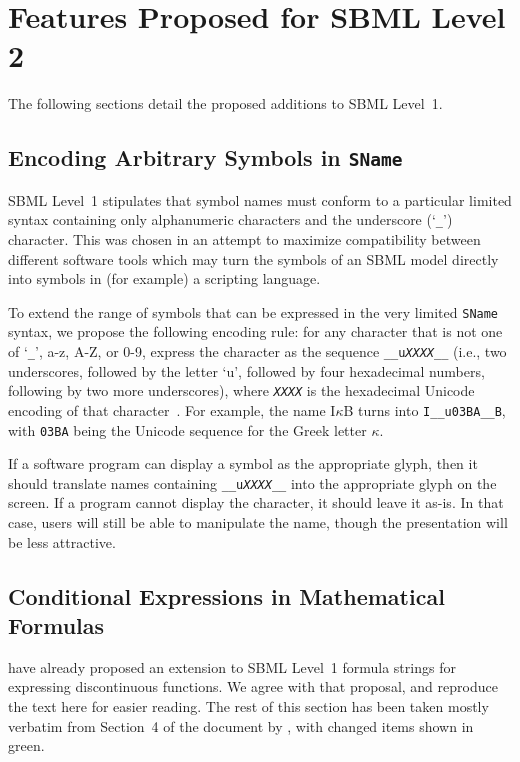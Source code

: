 \documentclass[10pt]{cekarticle}
\begin{document}
\section{Features Proposed for SBML Level 2}

The following sections detail the proposed additions to SBML Level~1.


\subsection{Encoding Arbitrary Symbols in \texttt{SName}}
\label{sec:encoding}

SBML Level~1 stipulates that symbol names must conform to a particular
limited syntax containing only alphanumeric characters and the underscore
(`\texttt{\_}') character.  This was chosen in an attempt to maximize
compatibility between different software tools which may turn the symbols
of an SBML model directly into symbols in (for example) a scripting
language.

To extend the range of symbols that can be expressed in the very limited
\texttt{SName} syntax, we propose the following encoding rule: for any
character that is not one of `\texttt{\_}', a-z, A-Z, or 0-9, express the
character as the sequence \texttt{\_\_u\textit{XXXX}\_\_} (i.e., two
underscores, followed by the letter `u', followed by four hexadecimal
numbers, following by two more underscores), where \texttt{\textit{XXXX}}
is the hexadecimal Unicode encoding of that
character~\citep{unicode:1996,unicode:2002}.  For example, the name
I$\kappa$B turns into \texttt{I\_\_u03BA\_\_B}, with \texttt{03BA} being
the Unicode sequence for the Greek letter $\kappa$.

If a software program can display a symbol as the appropriate glyph, then
it should translate names containing \texttt{\_\_u\textit{XXXX}\_\_} into the
appropriate glyph on the screen.  If a program cannot display the
character, it should leave it as-is.  In that case, users will still be
able to manipulate the name, though the presentation will be less
attractive.



\subsection{Conditional Expressions in Mathematical Formulas}
\label{sec:conditionals}

\citet{finney:2002c} have already proposed an extension to SBML Level~1
formula strings for expressing discontinuous functions.  We agree with that
proposal, and reproduce the text here for easier reading.  The rest of this
section has been taken mostly verbatim from Section~4 of the document by
\citet{finney:2002c}, with changed items shown in {\color{green}green}.
\end{document}
